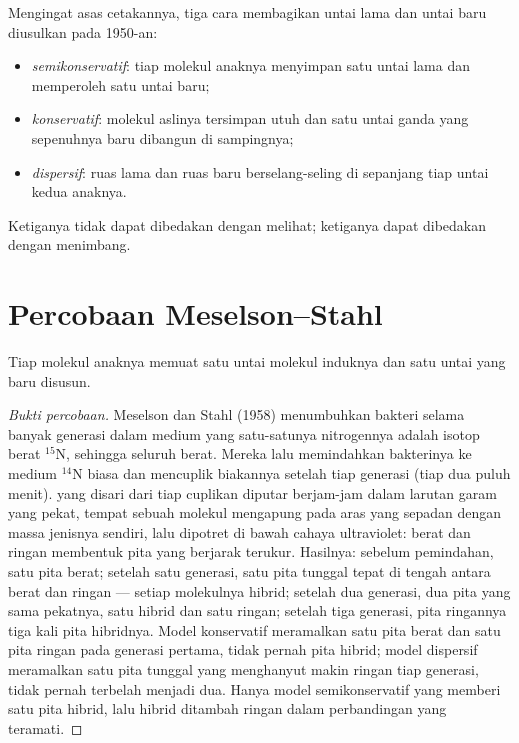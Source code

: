 \begin{example}\label{ex:g11:dna-replication:models}
Mengingat asas cetakannya, tiga cara membagikan untai lama dan untai
baru diusulkan pada 1950-an:
\begin{itemize}
  \item \emph{semikonservatif}: tiap molekul anaknya menyimpan satu
        untai lama dan memperoleh satu untai baru;
  \item \emph{konservatif}: molekul aslinya tersimpan utuh dan satu
        untai ganda yang sepenuhnya baru dibangun di sampingnya;
  \item \emph{dispersif}: ruas lama dan ruas baru berselang-seling di
        sepanjang tiap untai kedua anaknya.
\end{itemize}
Ketiganya tidak dapat dibedakan dengan melihat; ketiganya dapat
dibedakan dengan menimbang.
\end{example}

\section{Percobaan Meselson--Stahl}

\begin{proposition}\label{prop:g11:dna-replication:semiconservative}
Tiap molekul  anaknya memuat satu untai molekul induknya dan satu
untai yang baru disusun.
\end{proposition}
\begin{proof}[Bukti percobaan]
Meselson dan Stahl (1958) menumbuhkan bakteri selama banyak generasi
dalam medium yang satu-satunya nitrogennya adalah isotop berat
$^{15}$N, sehingga seluruh  berat. Mereka lalu memindahkan
bakterinya ke medium $^{14}$N biasa dan mencuplik biakannya setelah tiap
generasi (tiap dua puluh menit).  yang disari dari tiap cuplikan
diputar berjam-jam dalam larutan garam yang pekat, tempat sebuah
molekul mengapung pada aras yang sepadan dengan massa jenisnya sendiri,
lalu dipotret di bawah cahaya ultraviolet:  berat dan  ringan
membentuk pita yang berjarak terukur. Hasilnya: sebelum pemindahan,
satu pita berat; setelah satu generasi, satu pita tunggal tepat di
tengah antara berat dan ringan --- setiap molekulnya hibrid; setelah
dua generasi, dua pita yang sama pekatnya, satu hibrid dan satu ringan;
setelah tiga generasi, pita ringannya tiga kali pita hibridnya. Model
konservatif meramalkan satu pita berat dan satu pita ringan pada
generasi pertama, tidak pernah pita hibrid; model dispersif meramalkan
satu pita tunggal yang menghanyut makin ringan tiap generasi, tidak
pernah terbelah menjadi dua. Hanya model semikonservatif yang memberi
satu pita hibrid, lalu hibrid ditambah ringan dalam perbandingan yang
teramati.
\end{proof}

